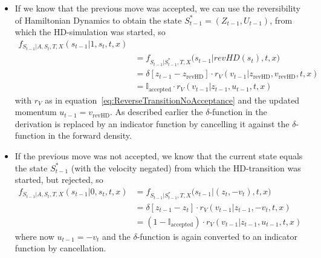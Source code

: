 \begin{itemize}
\item If we know that the previous move was accepted, we can use the reversibility of Hamiltonian Dynamics to obtain the state $S_{t-1}^* = (Z_{t-1}, U_{t-1})$, from which the HD-simulation was started, so
\begin{equation}
\begin{split}
f_{S_{t-1} |A, S_t, T, X}(s_{t-1} | 1, s_t, t, x) \\
&= f_{S_{t-1} |S_{t-1}^*, T, X}\big(s_{t-1} | revHD(s_t), t, x\big) \\
&= \delta \left[z_{t-1} - z_{\textrm{revHD}} \right] \cdot r_V(v_{t-1}|z_{\textrm{revHD}}, v_{\textrm{revHD}}, t, x) \\
&= \mathbb{I}_\textrm{accepted} \cdot r_V(v_{t-1}|z_{t-1}, u_{t-1}, t, x) 
\end{split}
\end{equation}
with $r_V$ as in equation~\eqref{eq:ReverseTransitionNoAcceptance} and the updated momentum $u_{t-1} = v_{\textrm{revHD}}$. As described earlier the $\delta$-function in the derivation is replaced by an indicator function by cancelling it against the $\delta$-function in the forward density.
\item If the previous move was not accepted, we know that the current state equals the state $S_{t-1}^*$ (with the velocity negated) from which the HD-transition was started, but rejected, so
\begin{equation}
\begin{split}
f_{S_{t-1} |A, S_t, T, X}(s_{t-1} | 0, s_t, t, x) &= f_{S_{t-1} |S_{t-1}^*, T, X}\big(s_{t-1} | (z_t, -v_t), t, x\big) \\
&= \delta \left[z_{t-1} - z_{t} \right] \cdot r_V(v_{t-1}|z_{t-1}, -v_t, t, x) \\
&= (1 - \mathbb{I}_\textrm{accepted}) \cdot r_V(v_{t-1}| z_{t-1}, u_{t-1}, t, x)
\end{split}
\end{equation}
where now $u_{t-1} = -v_t$ and the $\delta$-function is again converted to an indicator function by cancellation.


\end{itemize}
